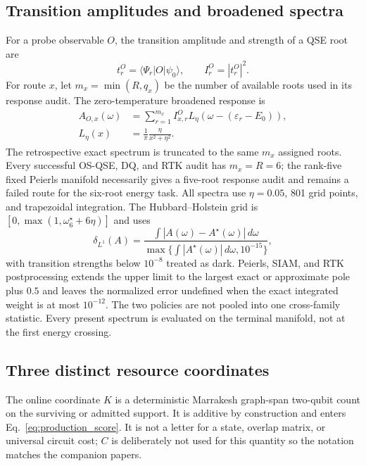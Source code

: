 \documentclass[
  reprint,
  amsmath,
  amssymb,
  aps,
  pra,
  nofootinbib,
  superscriptaddress,
  floatfix
]{revtex4-2}
\newcommand{\ket}[1]{|#1\rangle}
\newcommand{\bra}[1]{\langle #1|}
\begin{document}
\subsection{Transition amplitudes and broadened spectra}
\label{sec:transition_spectra}

For a probe observable $O$, the transition amplitude and strength of a QSE
root are
\begin{equation}
 t_r^O=\bra{\Psi_r}O\ket{\psi_0},
 \qquad I_r^O=|t_r^O|^2.
 \label{eq:transition_strength}
\end{equation}
For route $x$, let $m_x=\min(R,q_x)$ be the number of available roots used in
its response audit.  The zero-temperature broadened response is
\begin{align}
 A_{O,x}(\omega)
 &=\sum_{r=1}^{m_x}I_{x,r}^O
 L_\eta\!\left(\omega-(\varepsilon_r-E_0)\right),
 \nonumber\\
 L_\eta(x)&=\frac{1}{\pi}\frac{\eta}{x^2+\eta^2}.
 \label{eq:broadened_spectrum}
\end{align}
The retrospective exact spectrum is truncated to the same $m_x$ assigned
roots.  Every successful OS-QSE, DQ, and RTK audit has $m_x=R=6$; the
rank-five fixed Peierls manifold necessarily gives a five-root response audit
and remains a failed route for the six-root energy task.  All spectra use
$\eta=0.05$, 801 grid points, and trapezoidal integration.  The
Hubbard--Holstein grid is
$[0,\max(1,\omega_6^\star+6\eta)]$ and uses
\begin{equation}
 \delta_{L^1}(A)=
 \frac{\int|A(\omega)-A^\star(\omega)|\,d\omega}
 {\max\{\int|A^\star(\omega)|\,d\omega,10^{-15}\}},
 \label{eq:hh_spectral_error}
\end{equation}
with transition strengths below $10^{-8}$ treated as dark.  Peierls, SIAM,
and RTK postprocessing extends the upper limit to the largest exact or
approximate pole plus $0.5$ and leaves the normalized error undefined when
the exact integrated weight is at most $10^{-12}$.  The two policies are not
pooled into one cross-family statistic.  Every present spectrum is evaluated
on the terminal manifold, not at the first energy crossing.

\subsection{Three distinct resource coordinates}
\label{sec:resource_boundary}

The online coordinate $K$ is a deterministic Marrakesh graph-span
two-qubit count on the surviving or admitted support.  It is additive by
construction and enters Eq.~\eqref{eq:production_score}.  It is not a letter
for a state, overlap matrix, or universal circuit cost; $C$ is deliberately
not used for this quantity so the notation matches the companion papers.
\end{document}
